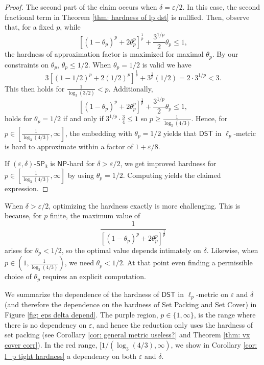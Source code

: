\documentclass{article}\providecommand{\DeclareRedundantLanguages}[2]{}\usepackage[a4paper,margin=20mm]{geometry}
\newcommand{\1}{\textbf{1}}
\newcommand{\setpT}{$\mathsf{SP_3}$\xspace}
\newcommand{\dst}{$\mathsf{DST}$\xspace}
\newcommand{\np}{$\mathsf{NP}$\xspace}
\newcommand{\pcoord}{\theta_p}
\begin{document}
\begin{proof}
The second part of the claim occurs when $\delta = \varepsilon/2$. In this case, the second fractional term in Theorem \ref{thm: hardness of lp dst} is nullfied. Then, observe that, for a fixed $p$, while 
\[
[(1-\pcoord)^p + 2\pcoord^p]^{\frac{1}{p}} +\frac{3^{1/p}}{2}\pcoord \leq 1,
\]
the hardness of approximation factor is maximized for maximal $\pcoord$. By our constraints on $\pcoord$, $\pcoord \leq 1/2$. When $\pcoord = 1/2$ is valid we have
\[
3[(1-1/2)^p + 2(1/2)^p]^{\frac{1}{p}} + 3^{\frac{1}{p}}(1/2) = 2\cdot3^{1/p} < 3.
\]
This then holds for  $\frac{1}{\log_3(3/2)} < p.$
Additionally, 
\[
[(1-\pcoord)^p + 2\pcoord^p]^{\frac{1}{p}} +\frac{3^{1/p}}{2}\pcoord \leq 1,
\]
holds for $\pcoord = 1/2$ if and only if  $3^{1/p} \cdot \frac{3}{4} \leq 1$ so $p \geq \frac{1}{\log_3(4/3)}.$ Hence, for $p \in [\frac{1}{\log_3(4/3)}, \infty]$, the embedding with $\pcoord = 1/2$ yields that   \dst in $\ell_p$-metric is hard to approximate within a factor of $1 + \varepsilon/8$.



If $(\varepsilon, \delta)$-\setpT is \np-hard for $\delta > \varepsilon/2$, we get improved hardness for $p \in [\frac{1}{\log_3(4/3)}, \infty]$ by using $\theta_p = 1/2$. Computing yields the claimed expression.
\end{proof}




When $\delta > \varepsilon/2$, optimizing the hardness exactly is more challenging. This is because, for $p$ finite, the maximum value of 
\[
\frac{1}{[(1-\pcoord)^p + 2\pcoord^p]^{\frac{1}{p}}}
\]
arises for $\theta_p < 1/2$, so the optimal value depends intimately on $\delta$. Likewise, when $p \in (1, \frac{1}{\log_3(4/3)})$, we need $\pcoord < 1/2$. At that point even finding a permissible choice of $\pcoord$ requires an explicit computation. 

We summarize the dependence of the hardness of  \dst in $\ell_p$-metric  on $\varepsilon$ and $\delta$ (and therefore the dependence on the hardness of Set Packing and Set Cover) in Figure \ref{fig: eps delta depend}. 
The purple region, $p \in \{1, \infty\}$, is the range where there is no dependency on $\varepsilon$, and hence the reduction only uses the hardness of set packing (see Corollary \ref{cor: general metric useless?} and Theorem \ref{thm: vx cover corr}). In the red range, $[1/(\log_3(4/3), \infty)$, we show in Corollary \ref{cor: l_p tight hardness} a dependency on both $\varepsilon$ and $\delta$.
\end{document}
